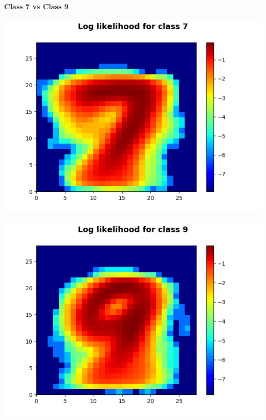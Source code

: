 \documentclass[11pt]{article}
\begin{document}
\pagebreak
\textbf{Class 7 vs Class 9}\\
\begin{center}
\includegraphics[scale=0.75]{part1/1/log_likelihood_7.png}
\end{center}

\begin{center}
\includegraphics[scale=0.75]{part1/1/log_likelihood_9.png}
\end{center}
\end{document}
